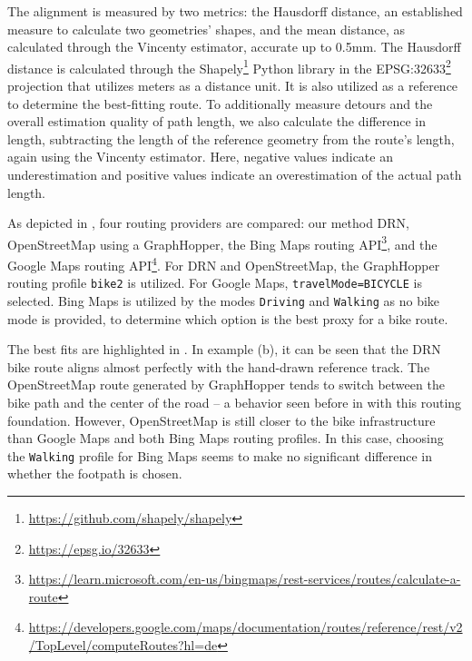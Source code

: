 The alignment is measured by two metrics: the Hausdorff distance, an established measure to calculate two geometries' shapes, and the mean distance, as calculated through the Vincenty estimator, accurate up to 0.5mm. The Hausdorff distance is calculated through the Shapely\footnote{\url{https://github.com/shapely/shapely}} Python library in the EPSG:32633\footnote{\url{https://epsg.io/32633}} projection that utilizes meters as a distance unit. It is also utilized as a reference to determine the best-fitting route. To additionally measure detours and the overall estimation quality of path length, we also calculate the difference in length, subtracting the length of the reference geometry from the route's length, again using the Vincenty estimator. Here, negative values indicate an underestimation and positive values indicate an overestimation of the actual path length.

As depicted in , four routing providers are compared: our method DRN, OpenStreetMap using a GraphHopper, the Bing Maps routing API\footnote{\url{https://learn.microsoft.com/en-us/bingmaps/rest-services/routes/calculate-a-route}}, and the Google Maps routing API\footnote{\url{https://developers.google.com/maps/documentation/routes/reference/rest/v2/TopLevel/computeRoutes?hl=de}}. For DRN and OpenStreetMap, the GraphHopper routing profile \texttt{bike2} is utilized. For Google Maps, \texttt{travelMode=\allowbreak BICYCLE} is selected. Bing Maps is utilized by the modes \texttt{Driving} and \texttt{Walking} as no bike mode is provided, to determine which option is the best proxy for a bike route.

The best fits are highlighted in . In example (b), it can be seen that the DRN bike route aligns almost perfectly with the hand-drawn reference track. The OpenStreetMap route generated by GraphHopper tends to switch between the bike path and the center of the road -- a behavior seen before in  with this routing foundation. However, OpenStreetMap is still closer to the bike infrastructure than Google Maps and both Bing Maps routing profiles. In this case, choosing the \texttt{Walking} profile for Bing Maps seems to make no significant difference in whether the footpath is chosen.


